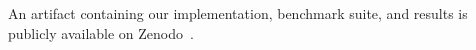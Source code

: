 \documentclass[acmsmall]{acmart}
\begin{document}
An artifact containing our implementation, benchmark suite, and results is publicly available on Zenodo~\cite{artifact}.



% 
% 
% 


\ifdefined\showappendix
\newpage
\appendix






% 
% 


\else
\fi
\end{document}
